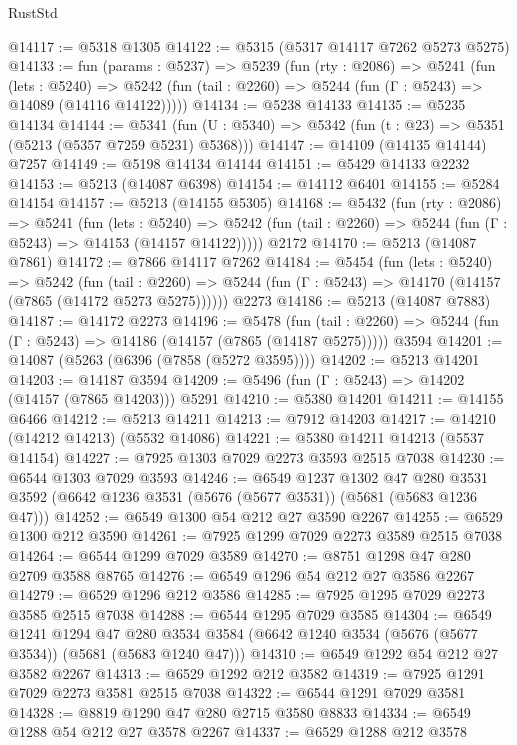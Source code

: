 \begin{lexlean}{RustStd}
\begin{coremodule}
@14117 := @5318 @1305
@14122 := @5315 (@5317 @14117 @7262 @5273 @5275)
@14133 := fun (params : @5237) =>
  @5239
    (fun (rty : @2086) =>
    @5241
      (fun (lets : @5240) =>
      @5242 (fun (tail : @2260) => @5244 (fun (Γ : @5243) => @14089 (@14116 @14122)))))
@14134 := @5238 @14133
@14135 := @5235 @14134
@14144 := @5341
    (fun (U : @5340) => @5342 (fun (t : @23) => @5351 (@5213 (@5357 @7259 @5231) @5368)))
@14147 := @14109 (@14135 @14144) @7257
@14149 := @5198 @14134 @14144
@14151 := @5429 @14133 @2232
@14153 := @5213 (@14087 @6398)
@14154 := @14112 @6401
@14155 := @5284 @14154
@14157 := @5213 (@14155 @5305)
@14168 := @5432
    (fun (rty : @2086) =>
    @5241
      (fun (lets : @5240) =>
      @5242 (fun (tail : @2260) => @5244 (fun (Γ : @5243) => @14153 (@14157 @14122)))))
    @2172
@14170 := @5213 (@14087 @7861)
@14172 := @7866 @14117 @7262
@14184 := @5454
    (fun (lets : @5240) =>
    @5242
      (fun (tail : @2260) =>
      @5244 (fun (Γ : @5243) => @14170 (@14157 (@7865 (@14172 @5273 @5275))))))
    @2273
@14186 := @5213 (@14087 @7883)
@14187 := @14172 @2273
@14196 := @5478
    (fun (tail : @2260) => @5244 (fun (Γ : @5243) => @14186 (@14157 (@7865 (@14187 @5275)))))
    @3594
@14201 := @14087 (@5263 (@6396 (@7858 (@5272 @3595))))
@14202 := @5213 @14201
@14203 := @14187 @3594
@14209 := @5496 (fun (Γ : @5243) => @14202 (@14157 (@7865 @14203))) @5291
@14210 := @5380 @14201
@14211 := @14155 @6466
@14212 := @5213 @14211
@14213 := @7912 @14203
@14217 := @14210 (@14212 @14213) (@5532 @14086)
@14221 := @5380 @14211 @14213 (@5537 @14154)
@14227 := @7925 @1303 @7029 @2273 @3593 @2515 @7038
@14230 := @6544 @1303 @7029 @3593
@14246 := @6549
    @1237
    @1302
    @47
    @280
    @3531
    @3592
    (@6642 @1236 @3531 (@5676 (@5677 @3531)) (@5681 (@5683 @1236 @47)))
@14252 := @6549 @1300 @54 @212 @27 @3590 @2267
@14255 := @6529 @1300 @212 @3590
@14261 := @7925 @1299 @7029 @2273 @3589 @2515 @7038
@14264 := @6544 @1299 @7029 @3589
@14270 := @8751 @1298 @47 @280 @2709 @3588 @8765
@14276 := @6549 @1296 @54 @212 @27 @3586 @2267
@14279 := @6529 @1296 @212 @3586
@14285 := @7925 @1295 @7029 @2273 @3585 @2515 @7038
@14288 := @6544 @1295 @7029 @3585
@14304 := @6549
    @1241
    @1294
    @47
    @280
    @3534
    @3584
    (@6642 @1240 @3534 (@5676 (@5677 @3534)) (@5681 (@5683 @1240 @47)))
@14310 := @6549 @1292 @54 @212 @27 @3582 @2267
@14313 := @6529 @1292 @212 @3582
@14319 := @7925 @1291 @7029 @2273 @3581 @2515 @7038
@14322 := @6544 @1291 @7029 @3581
@14328 := @8819 @1290 @47 @280 @2715 @3580 @8833
@14334 := @6549 @1288 @54 @212 @27 @3578 @2267
@14337 := @6529 @1288 @212 @3578

\end{coremodule}
\end{lexlean}
